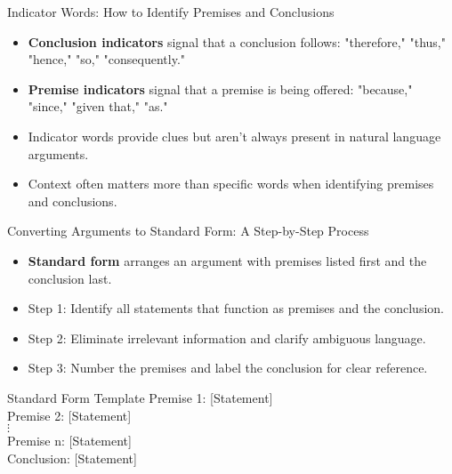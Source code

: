 \documentclass{beamer}
\begin{document}
\begin{frame}{Indicator Words: How to Identify Premises and Conclusions}
    \begin{itemize}
        \item \textbf{Conclusion indicators} signal that a conclusion follows: "therefore," "thus," "hence," "so," "consequently."
        \item \textbf{Premise indicators} signal that a premise is being offered: "because," "since," "given that," "as."
        \item Indicator words provide clues but aren't always present in natural language arguments.
        \item Context often matters more than specific words when identifying premises and conclusions.
    \end{itemize}
    
\end{frame}

\begin{frame}{Converting Arguments to Standard Form: A Step-by-Step Process}
    \begin{itemize}
        \item \textbf{Standard form} arranges an argument with premises listed first and the conclusion last.
        \item Step 1: Identify all statements that function as premises and the conclusion.
        \item Step 2: Eliminate irrelevant information and clarify ambiguous language.
        \item Step 3: Number the premises and label the conclusion for clear reference.
    \end{itemize}
    
    \begin{block}{Standard Form Template}
        Premise 1: [Statement]\\
        Premise 2: [Statement]\\
        $\vdots$\\
        Premise n: [Statement]\\
        Conclusion: [Statement]
    \end{block}
\end{frame}
\end{document}
